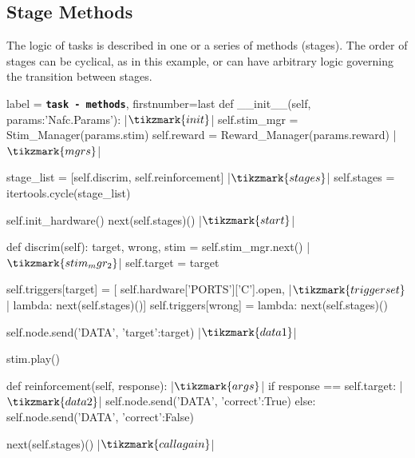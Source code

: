 \clearpage

\subsection{Stage Methods}

The logic of tasks is described in one or a series of methods (stages). The order of stages can be cyclical, as in this example, or can have arbitrary logic governing the transition between stages.
\vspace{10pt}

\begin{pythoncode*}{label = \texttt{\textbf{task - methods}}, firstnumber=last}
    def __init__(self, params:'Nafc.Params'): |$\tikzmark{init}$|
        self.stim_mgr = Stim_Manager(params.stim)
        self.reward   = Reward_Manager(params.reward) |$\tikzmark{mgrs}$|

        stage_list  = [self.discrim, self.reinforcement] |$\tikzmark{stages}$|
        self.stages = itertools.cycle(stage_list)

        self.init_hardware()
        next(self.stages)() |$\tikzmark{start}$|

    def discrim(self):
        target, wrong, stim = self.stim_mgr.next() |$\tikzmark{stim_mgr_2}$|
        self.target = target

        self.triggers[target] = [
            self.hardware['PORTS']['C'].open, |$\tikzmark{triggerset}$|
            lambda: next(self.stages)()]
        self.triggers[wrong] = lambda: next(self.stages)()

        self.node.send('DATA', {'target':target}) |$\tikzmark{data1}$|

        stim.play()

    def reinforcement(self, response): |$\tikzmark{args}$|
        if response == self.target: |$\tikzmark{data2}$|
            self.node.send('DATA', {'correct':True})
        else:
            self.node.send('DATA', {'correct':False})

        next(self.stages)() |$\tikzmark{callagain}$|
\end{pythoncode*}
